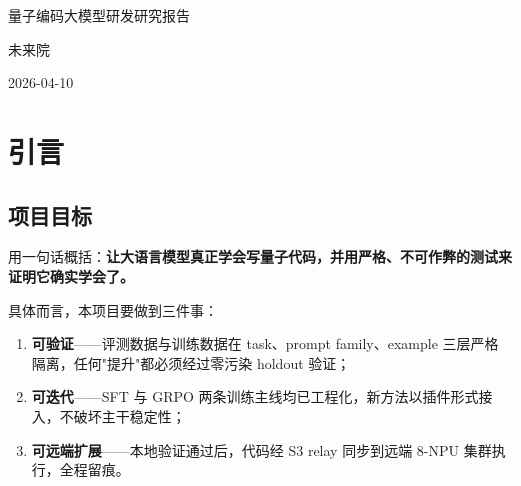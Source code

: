 \documentclass[11pt,a4paper]{article}
\title{\zh{量子编码大模型研发研究报告}}
\author{未来院}
\date{2026-04-10}
\begin{document}
\begin{titlepage}
\centering
{\zhfont\LARGE 量子编码大模型研发研究报告\par}
\vspace{1.2cm}
{\zhfont\large 未来院\par}
\vspace{0.4cm}
{\zhfont\large 2026-04-10\par}
\vfill
\end{titlepage}

\tableofcontents
\clearpage




\section{引言}

\noindent{}

\subsection{项目目标}

用一句话概括：\textbf{让大语言模型真正学会写量子代码，并用严格、不可作弊的测试来证明它确实学会了。}

具体而言，本项目要做到三件事：
\begin{enumerate}
  \item \textbf{可验证}——评测数据与训练数据在 task、prompt family、example 三层严格隔离，任何"提升"都必须经过零污染 holdout 验证；
  \item \textbf{可迭代}——SFT 与 GRPO 两条训练主线均已工程化，新方法以插件形式接入，不破坏主干稳定性；
  \item \textbf{可远端扩展}——本地验证通过后，代码经 S3 relay 同步到远端 8-NPU 集群执行，全程留痕。
\end{enumerate}
\end{document}
